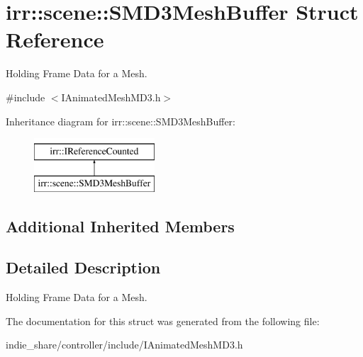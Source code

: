 \hypertarget{structirr_1_1scene_1_1SMD3MeshBuffer}{}\section{irr\+:\+:scene\+:\+:S\+M\+D3\+Mesh\+Buffer Struct Reference}
\label{structirr_1_1scene_1_1SMD3MeshBuffer}


Holding Frame Data for a Mesh.  




{\ttfamily \#include $<$I\+Animated\+Mesh\+M\+D3.\+h$>$}

Inheritance diagram for irr\+:\+:scene\+:\+:S\+M\+D3\+Mesh\+Buffer\+:\begin{figure}[H]
\begin{center}
\leavevmode
\includegraphics[height=2.000000cm]{structirr_1_1scene_1_1SMD3MeshBuffer}
\end{center}
\end{figure}
\subsection*{Additional Inherited Members}


\subsection{Detailed Description}
Holding Frame Data for a Mesh. 

The documentation for this struct was generated from the following file\+:\begin{DoxyCompactItemize}
\item 
indie\+\_\+share/controller/include/I\+Animated\+Mesh\+M\+D3.\+h\end{DoxyCompactItemize}
